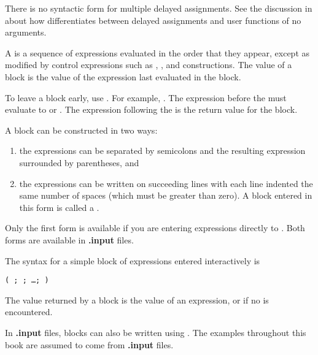 {There is no syntactic form for multiple delayed assignments.
See the discussion in
about how \Language{} differentiates between delayed assignments and
user functions of no arguments.



A  is a sequence of expressions evaluated
in the order that they appear, except as modified by control expressions
such as ,
,
 and
 constructions.
The value of a block is the value of the expression last evaluated
in the block.

To leave a block early, use \spadSyntax{=>}.
For example, .
The expression before the \spadSyntax{=>} must evaluate to
 or .
The expression following the \spadSyntax{=>} is the return value
for the block.

A block can be constructed in two ways:
\begin{enumerate}
\item the expressions can be separated by semicolons
and the resulting expression surrounded by parentheses, and
\item the expressions can be written on succeeding lines with each line
indented the same number of spaces (which must be greater than zero).
A block entered in this form is
called a .
\end{enumerate}
Only the first form is available if you are entering expressions
directly to \Language{}.
Both forms are available in {\bf .input} files.

\beginImportant
The syntax for a simple block of expressions entered interactively is
\begin{center}
{\tt ( ; ; \ldots;  )}
\end{center}
The value returned by a block is the value of an
\spadSyntax{=>} expression, or 
if no \spadSyntax{=>} is encountered.
\endImportant

In {\bf .input} files, blocks can also be written using
.
The examples throughout this book are assumed to come from {\bf .input} files.

}
